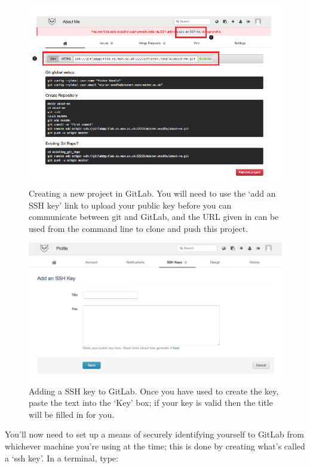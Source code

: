 \begin{figure}
\centerline{\includegraphics[width=15cm]{images/GitLab-new-project}}
\caption{Creating a new project in GitLab. \protect{} You will need to use the  `add an SSH key' link to upload your public key before you can communicate between git and GitLab, and the URL given in \protect{} can be used from the command line to clone and push this project.}\label{figure:GitLab-new-project}
\end{figure}

\begin{figure}
\centerline{\includegraphics[width=13cm]{images/GitLab-ssh}}
\caption{Adding a SSH key to GitLab. Once you have used  to create the key, paste the text into the `Key' box; if your key is valid then the title will be filled in for you.}\label{figure:GitLab-ssh}
\end{figure}

You'll now need to set up a means of securely identifying yourself to GitLab from whichever machine you're using at the time; this is done by creating what's called a `ssh key'. In a terminal, type:

